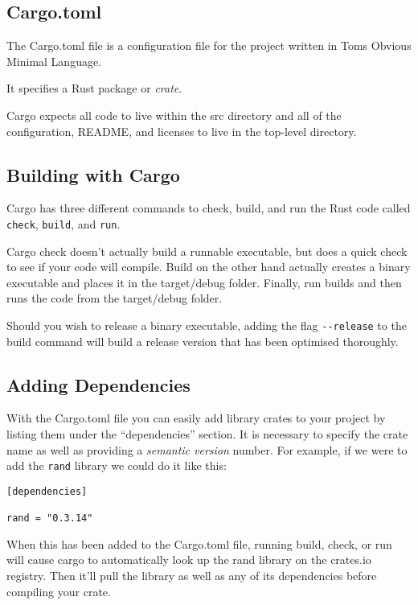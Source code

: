 \documentclass[12pt,notitlepage]{article}
\begin{document}
\subsection{Cargo.toml}

The Cargo.toml file is a configuration file for the project written in Toms
Obvious Minimal Language.

It specifies a Rust package or \emph{crate}.

Cargo expects all code to live within the src directory and all of the
configuration, README, and licenses to live in the top-level directory.

\subsection{Building with Cargo}

Cargo has three different commands to check, build, and run the Rust code
called \lstinline{check}, \lstinline{build}, and \lstinline{run}.

Cargo check doesn't actually build a runnable executable, but does a quick
check to see if your code will compile. Build on the other hand actually
creates a binary executable and places it in the target/debug folder. Finally,
run builds and then runs the code from the target/debug folder.

Should you wish to release a binary executable, adding the flag
\lstinline{--release} to the build command will build a release version that
has been optimised thoroughly.





\subsection{Adding Dependencies}

With the Cargo.toml file you can easily add library crates to your project by
listing them under the ``dependencies'' section. It is necessary to specify the
crate name as well as providing a \emph{semantic version} number. For example,
if we were to add the \lstinline{rand} library we could do it like this:

\begin{lstlisting}
[dependencies]

rand = "0.3.14"
\end{lstlisting}

When this has been added to the Cargo.toml file, running build, check, or run
will cause cargo to automatically look up the rand library on the crates.io
registry. Then it'll pull the library as well as any of its dependencies before
compiling your crate.
\end{document}
